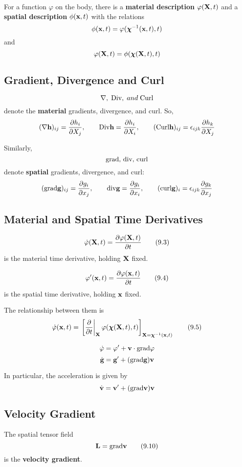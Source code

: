 \documentclass{article}
\newcommand{\Chi}{\boldsymbol{\chi}}
\begin{document}
\begin{remark}
	For a function $\varphi$ on the body, there is a \textbf{material description} $\varphi (\textbf{X} ,t)$ and a \textbf{spatial description} $\phi(\textbf{x} ,t)$ with the relations
	$$\phi(\x ,t) = \varphi(\Chi^{-1}(\x ,t),t)$$
	and
	$$\varphi(\X ,t) = \phi(\Chi(\X ,t),t)$$
\end{remark}
\subsection{Gradient, Divergence and Curl}
$$\nabla,\; \text{Div},\; and \; \text{Curl}$$
denote the \textbf{material} gradients, divergence, and curl. So,
$$ (\nabla \textbf{h})_{ij} = \frac{\partial {h_i}}{\partial {X_j}}, \qquad \text{Div}\textbf{h} = \frac{\partial {h_i}}{\partial {X_i}}, \qquad (\text{Curl}\textbf{h})_{ij} = \epsilon_{ijk}\frac{\partial {h_k}}{\partial {X_j}}$$
	
Similarly,
$$\text{grad}, \, \text{div}, \, \text{curl}$$
denote \textbf{spatial} gradients, divergence, and curl:
$$(\text{grad}\textbf{g})_{ij} = \frac{\partial {g_i}}{\partial {x_j}}, \qquad \text{div}\textbf{g} = \frac{\partial {g_i}}{\partial {x_i}}, \qquad (\text{curl}\textbf{g})_i = \epsilon
_{ijk}\frac{\partial {g_k}}{\partial {x_j}}$$

\subsection{Material and Spatial Time Derivatives}

\[
	\dot{\varphi}(\textbf{X},t) = \frac{\partial {\varphi(\textbf{X},t)}}{\partial {t}}\tag{9.3}
\]
is the material time derivative, holding $\textbf{X}$ fixed.

\[
	\varphi^\prime(\textbf{x},t) = \frac{\partial {\varphi(\textbf{x},t)}}{\partial {t}}\tag{9.4}
\]
is the spatial time derivative, holding $\textbf{x}$ fixed.

The relationship between them is
\[
	\dot{\varphi}(\x,t) =\left.\left[ \pd{}{t}\right|_{\X}\varphi(\Chi(\X,t),t) \right]_{\X=\Chi^{-1}(\x,t)}\tag{9.5}
\]

\begin{remark}

\[
	\dot{\varphi} = \varphi ^\prime + \textbf{v}\cdot \text{grad}\varphi
\]
\[
	\dot{\textbf{g}} = \textbf{g}^\prime + (\text{grad}\textbf{g})\textbf{v}
\]
\end{remark}

In particular, the acceleration is given by
\[
	\dot{\textbf{v}} = \textbf{v}^\prime + (\text{grad}\textbf{v})\textbf{v}
\]

\subsection{Velocity Gradient}

The spatial tensor field
\[
	\textbf{L} = \text{grad}\textbf{v}\tag{9.10}
\]
is the \textbf{velocity gradient}.
\end{document}
